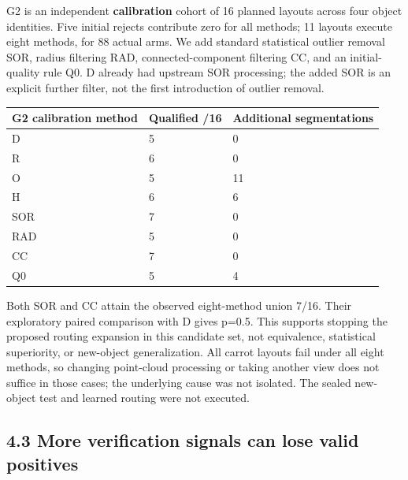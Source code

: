 \documentclass[10pt]{article}
\begin{document}
G2 is an independent \textbf{calibration} cohort of 16 planned layouts across four object identities. Five initial rejects contribute zero for all methods; 11 layouts execute eight methods, for 88 actual arms. We add standard statistical outlier removal SOR, radius filtering RAD, connected-component filtering CC, and an initial-quality rule Q0. D already had upstream SOR processing; the added SOR is an explicit further filter, not the first introduction of outlier removal.

\par\noindent\begin{minipage}{\linewidth}\centering\small\setlength{\tabcolsep}{4pt}\begin{tabular}{p{}p{}p{}}\hline
G2 calibration method & Qualified /16 & Additional segmentations \\ \hline
D & 5 & 0 \\
R & 6 & 0 \\
O & 5 & 11 \\
H & 6 & 6 \\
SOR & 7 & 0 \\
RAD & 5 & 0 \\
CC & 7 & 0 \\
Q0 & 5 & 4 \\
\hline\end{tabular}\end{minipage}\par\medskip

Both SOR and CC attain the observed eight-method union 7/16. Their exploratory paired comparison with D gives p=0.5. This supports stopping the proposed routing expansion in this candidate set, not equivalence, statistical superiority, or new-object generalization. All carrot layouts fail under all eight methods, so changing point-cloud processing or taking another view does not suffice in those cases; the underlying cause was not isolated. The sealed new-object test and learned routing were not executed.

\subsection*{4.3 More verification signals can lose valid positives}
\end{document}
